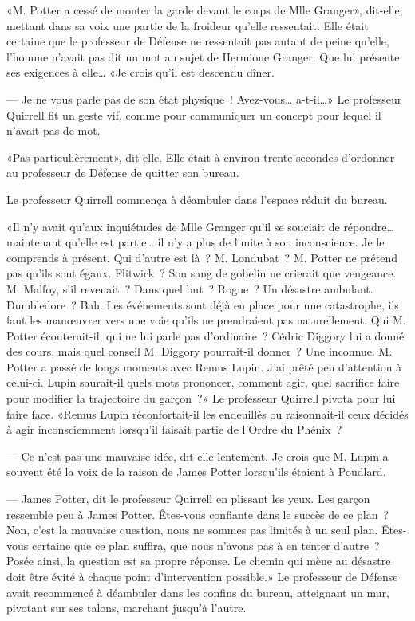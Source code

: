 «M. Potter a cessé de monter la garde devant le corps de Mlle Granger», dit-elle, mettant dans sa voix une partie de la froideur qu'elle ressentait. Elle était certaine que le professeur de Défense ne ressentait pas autant de peine qu'elle, l'homme n'avait pas dit un mot au sujet de Hermione Granger. Que lui présente ses exigences à elle… «Je crois qu'il est descendu dîner.

--- Je ne vous parle pas de son état physique~! Avez-vous… a-t-il…» Le professeur Quirrell fit un geste vif, comme pour communiquer un concept pour lequel il n'avait pas de mot.

«Pas particulièrement», dit-elle. Elle était à environ trente secondes d'ordonner au professeur de Défense de quitter son bureau.

Le professeur Quirrell commença à déambuler dans l'espace réduit du bureau.

«Il n'y avait qu'aux inquiétudes de Mlle Granger qu'il se souciait de répondre… maintenant qu'elle est partie… il n'y a plus de limite à son inconscience. Je le comprends à présent. Qui d'autre est là~? M. Londubat~? M. Potter ne prétend pas qu'ils sont égaux. Flitwick~? Son sang de gobelin ne crierait que vengeance. M. Malfoy, s'il revenait~? Dans quel but~? Rogue~? Un désastre ambulant. Dumbledore~? Bah. Les événements sont déjà en place pour une catastrophe, ils faut les manœuvrer vers une voie qu'ils ne prendraient pas naturellement. Qui M. Potter écouterait-il, qui ne lui parle pas d'ordinaire~? Cédric Diggory lui a donné des cours, mais quel conseil M. Diggory pourrait-il donner~? Une inconnue. M. Potter a passé de longs moments avec Remus Lupin. J'ai prêté peu d'attention à celui-ci. Lupin saurait-il quels mots prononcer, comment agir, quel sacrifice faire pour modifier la trajectoire du garçon~?» Le professeur Quirrell pivota pour lui faire face. «Remus Lupin réconfortait-il les endeuillés ou raisonnait-il ceux décidés à agir inconsciemment lorsqu'il faisait partie de l'Ordre du Phénix~?

--- Ce n'est pas une mauvaise idée, dit-elle lentement. Je crois que M. Lupin a souvent été la voix de la raison de James Potter lorsqu'ils étaient à Poudlard.

--- James Potter, dit le professeur Quirrell en plissant les yeux. Les garçon ressemble peu à James Potter. Êtes-vous confiante dans le succès de ce plan~? Non, c'est la mauvaise question, nous ne sommes pas limités à un seul plan. Êtes-vous certaine que ce plan suffira, que nous n'avons pas à en tenter d'autre~? Posée ainsi, la question est sa propre réponse. Le chemin qui mène au désastre doit être évité à chaque point d'intervention possible.» Le professeur de Défense avait recommencé à déambuler dans les confins du bureau, atteignant un mur, pivotant sur ses talons, marchant jusqu'à l'autre.

